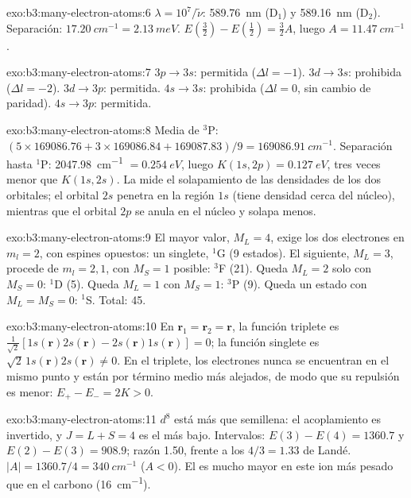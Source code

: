 \begin{solution}{exo:b3:many-electron-atoms:6}
$\lambda = 10^7/\tilde\nu$: \qty{589.76}{nm} (D$_1$) y \qty{589.16}{nm}
(D$_2$). Separación: $\qty{17.20}{cm^{-1}} = \qty{2.13}{meV}$. $E(\frac32) -
E(\frac12) = \frac32A$, luego $A = \qty{11.47}{cm^{-1}}$.
\end{solution}

\begin{solution}{exo:b3:many-electron-atoms:7}
$3p \to 3s$: permitida ($\Delta l = -1$). $3d \to 3s$: prohibida ($\Delta l = -2$).
$3d \to 3p$: permitida. $4s \to 3s$: prohibida ($\Delta l = 0$, sin cambio de
paridad). $4s \to 3p$: permitida.
\end{solution}

\begin{solution}{exo:b3:many-electron-atoms:8}
Media de ${}^3$P: $(5 \times 169086.76 + 3 \times 169086.84 + 169087.83)/9 =
\qty{169086.91}{cm^{-1}}$. Separación hasta ${}^1$P: \qty{2047.98}{cm^{-1}} $=
\qty{0.254}{eV}$, luego $K(1s,2p) = \qty{0.127}{eV}$, tres veces menor que
$K(1s,2s)$. La  mide el solapamiento de las densidades de los dos
orbitales; el orbital $2s$ penetra en la región $1s$ (tiene densidad
cerca del núcleo), mientras que el orbital $2p$ se anula en el núcleo y solapa menos.
\end{solution}

\begin{solution}{exo:b3:many-electron-atoms:9}
El mayor valor, $M_L = 4$, exige los dos electrones en $m_l = 2$, con espines opuestos: un
singlete, ${}^1$G (9 estados). El siguiente, $M_L = 3$, procede de $m_l = 2, 1$, con
$M_S = 1$ posible: ${}^3$F (21). Queda $M_L = 2$ solo con $M_S = 0$:
${}^1$D (5). Queda $M_L = 1$ con $M_S = 1$: ${}^3$P (9). Queda un estado con
$M_L = M_S = 0$: ${}^1$S. Total: 45.
\end{solution}

\begin{solution}{exo:b3:many-electron-atoms:10}
En $\mathbf r_1 = \mathbf r_2 = \mathbf r$, la función triplete es
$\frac{1}{\sqrt2}[1s(\mathbf r)2s(\mathbf r) - 2s(\mathbf r)1s(\mathbf r)] = 0$; la
función singlete es $\sqrt2\,1s(\mathbf r)2s(\mathbf r) \ne 0$. En el triplete, los
electrones nunca se encuentran en el mismo punto y están por término medio más
alejados, de modo que su repulsión es menor: $E_+ - E_- = 2K > 0$.
\end{solution}

\begin{solution}{exo:b3:many-electron-atoms:11}
$d^8$ está más que semillena: el acoplamiento es invertido, y $J = L + S = 4$ es
el más bajo. Intervalos: $E(3) - E(4) = 1360.7$ y $E(2) - E(3) = 908.9$; razón
1.50, frente a los $4/3 = 1.33$ de Landé. $|A| = 1360.7/4 = \qty{340}{cm^{-1}}$
($A < 0$). El  es mucho mayor en este ion más pesado que en el
carbono (\qty{16}{cm^{-1}}).
\end{solution}

